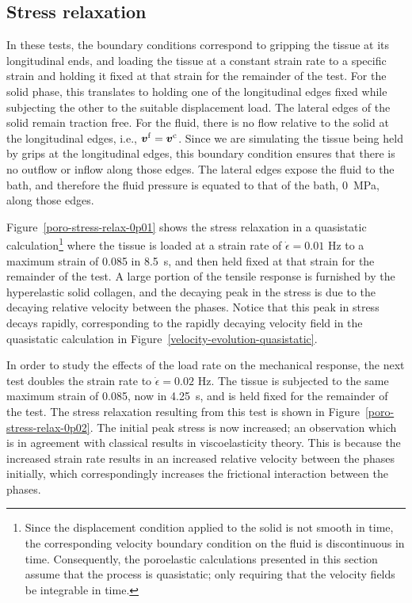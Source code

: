 \subsection{Stress relaxation}
\label{stress-relaxation}

In these tests, the boundary conditions correspond to gripping the
tissue at its longitudinal ends, and loading the tissue at a constant
strain rate to a specific strain and holding it fixed at that strain
for the remainder of the test. For the solid phase, this translates to
holding one of the longitudinal edges fixed while subjecting the other
to the suitable displacement load. The lateral edges of the solid
remain traction free. For the fluid, there is no flow relative to the
solid at the longitudinal edges, i.e., $\mbox{\boldmath$ v$}^{\mathrm{f}} =
\mbox{\boldmath$ v$}^{\mathrm{c}}$. Since we are simulating the tissue being held by
grips at the longitudinal edges, this boundary condition ensures that
there is no outflow or inflow along those edges. The lateral edges
expose the fluid to the bath, and therefore the fluid pressure is
equated to that of the bath, 0~MPa, along those edges.

Figure~\ref{poro-stress-relax-0p01} shows the stress relaxation in a
quasistatic calculation\footnote{Since the displacement condition
  applied to the solid is not smooth in time, the corresponding
  velocity boundary condition on the fluid is discontinuous in
  time. Consequently, the poroelastic calculations presented in this
  section assume that the process is quasistatic; only requiring that
  the velocity fields be integrable in time.}  where the tissue is
loaded at a strain rate of $\dot{\epsilon}=0.01$ Hz to a maximum
strain of 0.085 in 8.5~s, and then held fixed at that strain for the
remainder of the test. A large portion of the tensile response is
furnished by the hyperelastic solid collagen, and the decaying peak in
the stress is due to the decaying relative velocity between the
phases. Notice that this peak in stress decays rapidly, corresponding
to the rapidly decaying velocity field in the quasistatic calculation
in Figure~\ref{velocity-evolution-quasistatic}.

In order to study the effects of the load rate on the mechanical
response, the next test doubles the strain rate to $\dot{\epsilon} =
0.02$ Hz. The tissue is subjected to the same maximum strain of 0.085,
now in 4.25~s, and is held fixed for the remainder of the test. The
stress relaxation resulting from this test is shown in
Figure~\ref{poro-stress-relax-0p02}. The initial peak stress is now
increased; an observation which is in agreement with classical results
in viscoelasticity theory. This is because the increased strain rate
results in an increased relative velocity between the phases
initially, which correspondingly increases the frictional interaction
between the phases.

